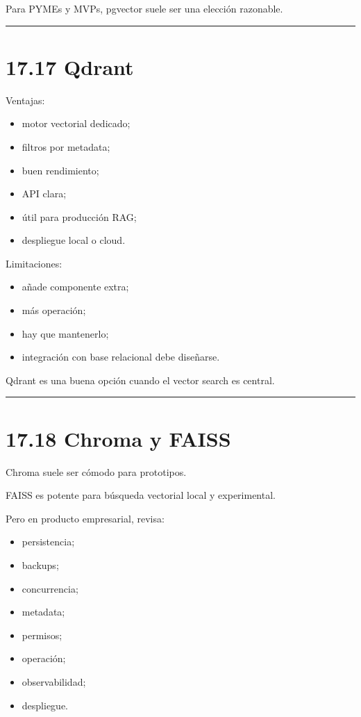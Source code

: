 Para PYMEs y MVPs, pgvector suele ser una elección razonable.

\begin{center}\rule{0.5\linewidth}{0.5pt}\end{center}

\section{17.17 Qdrant}\label{qdrant}

Ventajas:

\begin{itemize}
\tightlist
\item
  motor vectorial dedicado;
\item
  filtros por metadata;
\item
  buen rendimiento;
\item
  API clara;
\item
  útil para producción RAG;
\item
  despliegue local o cloud.
\end{itemize}

Limitaciones:

\begin{itemize}
\tightlist
\item
  añade componente extra;
\item
  más operación;
\item
  hay que mantenerlo;
\item
  integración con base relacional debe diseñarse.
\end{itemize}

Qdrant es una buena opción cuando el vector search es central.

\begin{center}\rule{0.5\linewidth}{0.5pt}\end{center}

\section{17.18 Chroma y FAISS}\label{chroma-y-faiss}

Chroma suele ser cómodo para prototipos.

FAISS es potente para búsqueda vectorial local y experimental.

Pero en producto empresarial, revisa:

\begin{itemize}
\tightlist
\item
  persistencia;
\item
  backups;
\item
  concurrencia;
\item
  metadata;
\item
  permisos;
\item
  operación;
\item
  observabilidad;
\item
  despliegue.
\end{itemize}

